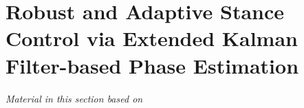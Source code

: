 \chapter{Robust and Adaptive Stance Control via Extended Kalman Filter-based
Phase Estimation}\label{sec:phase_estimation}
\graphicspath{{chapters/phase_estimation/figures/}}

\emph{Material in this section based on}
\citet{thatte2019realtime}\cite{thatte2019realtime} 
\linebreak






